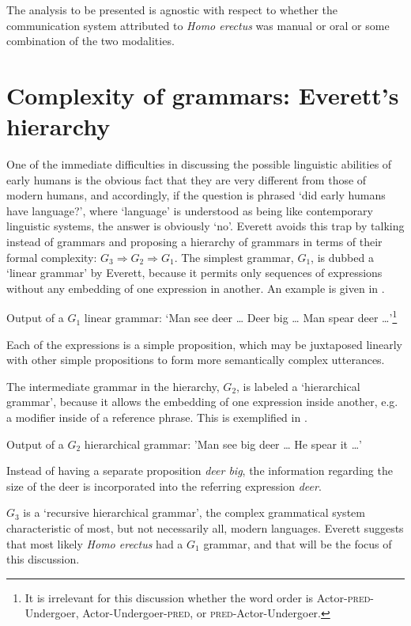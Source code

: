 \documentclass[output=paper,colorlinks,citecolor=brown]{langscibook}
\begin{document}
The analysis to be presented is agnostic with respect to whether the communication system attributed to \emph{Homo erectus} was manual or oral or some combination of the two modalities.

\section{Complexity of grammars: Everett’s hierarchy}\label{sec:vanvalin:2}
One of the immediate difficulties in discussing the possible linguistic abilities of early humans is the obvious fact that they are very different from those of modern humans, and accordingly, if the question is phrased ‘did early humans have language?’, where ‘language’ is understood as being like contemporary linguistic systems, the answer is obviously ‘no’.  Everett avoids this trap by talking instead of grammars and proposing a hierarchy of grammars in terms of their formal complexity: $G_3 \Rightarrow G_2 \Rightarrow G_1$.  The simplest grammar, $G_1$, is dubbed a ‘linear grammar’ by Everett, because it permits only sequences of expressions without any embedding of one expression in another. An example is given in .

\ea \label{vanvalin_example_1}
Output of a $G_1$ linear grammar: ‘Man see deer \ldots{}  Deer big \ldots{}  Man spear deer \ldots ’\footnote{It is irrelevant for this discussion whether the word order is Actor-\textsc{pred}-Undergoer, Actor-Undergoer-\textsc{pred}, or \textsc{pred}-Actor-Undergoer.}
\z

Each of the expressions is a simple proposition, which may be juxtaposed linearly with other simple propositions to form more semantically complex utterances.

The intermediate grammar in the hierarchy, $G_2$, is labeled a ‘hierarchical grammar’, because it allows the embedding of one expression inside another, e.g. a modifier inside of a reference phrase.  This is exemplified in .

\ea \label{vanvalin_example_2}
Output of a $G_2$ hierarchical grammar: 'Man see big deer \ldots{}  He spear it \ldots ’
\z

Instead of having a separate proposition \emph{deer big}, the information regarding the size of the deer is incorporated into the referring expression \emph{deer}.

$G_3$ is a ‘recursive hierarchical grammar’, the complex grammatical system characteristic of most, but not necessarily all, modern languages.  Everett suggests that most likely \emph{Homo erectus} had a $G_1$ grammar, and that will be the focus of this discussion.
\end{document}
